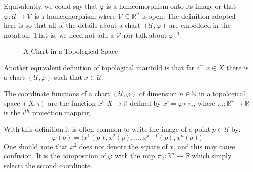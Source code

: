 \documentclass{article}                                                        %
\begin{document}
        Equivalently, we could say that $\varphi$ is a homeomorphism onto its
        image or that $\varphi:\mathcal{U}\rightarrow\mathcal{V}$ is a
        homeomorphism where $\mathcal{V}\subseteq\mathbb{R}^{n}$ is open. The
        definition adopted here is so that all of the details about a chart
        $(\mathcal{U},\varphi)$ are embedded in the notation. That is, we need
        not add a $\mathcal{V}$ nor talk about $\varphi^{\minus{1}}$.
        \begin{figure}[H]
            \centering
            \captionsetup{type=figure}
            
            \caption{A Chart in a Topological Space}
            \label{fig:Chart_in_Topological_Space}
        \end{figure}
        Another equivalent definition of topological manifold is that for all
        $x\in{X}$ there is a chart $(\mathcal{U},\varphi)$ such that
        $x\in\mathcal{U}$.
        \begin{definition}
            The coordinate functions of a chart $(\mathcal{U},\varphi)$ of
            dimension $n\in\mathbb{N}$ in a topological space $(X,\tau)$
            are the function $x^{i}:X\rightarrow\mathbb{R}$ defined by
            $x^{i}=\varphi\circ\pi_{i}$, where
            $\pi_{i}:\mathbb{R}^{n}\rightarrow\mathbb{R}$ is the $i^{th}$
            projection mapping.
        \end{definition}
        With this definition it is often common to write the image of a point
        $p\in\mathcal{U}$ by:
        \begin{equation}
            \varphi(p)=\big(x^{1}(p),x^{2}(p),\dots,x^{n-1}(p),x^{n}(p)\big)
        \end{equation}
        One should note that $x^{2}$ does not denote the square of $x$, and this
        may cause confusion. It is the composition of $\varphi$ with the map
        $\pi_{2}:\mathbb{R}^{n}\rightarrow\mathbb{R}$ which simply selects the
        second coordinate.
\end{document}
